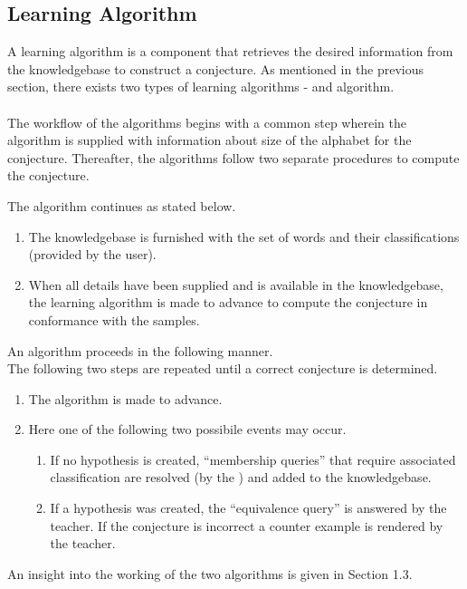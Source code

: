 \subsection{Learning Algorithm}
	A learning algorithm is a component that retrieves the desired information from the knowledgebase to construct a conjecture. As mentioned in the previous section, there exists two types of learning algorithms - \offline and \online algorithm. 
	\paragraph{}
	The workflow of the algorithms begins with a common step wherein the algorithm is supplied with information about size of the alphabet for the conjecture. Thereafter, the algorithms follow two separate procedures to compute the conjecture.
	
	The \offline algorithm continues as stated below.
\begin{enumerate}
	\item The knowledgebase is furnished with the set of words and their classifications (provided by the user).
	\item When all details have been supplied and is available in the knowledgebase, the learning algorithm is made to advance to 	compute the conjecture in conformance with the samples.
\end{enumerate}

	An \online algorithm proceeds in the following manner. \\
	The following two steps are repeated until a correct conjecture is determined.
\begin{enumerate}
\item The algorithm is made to advance.
\item Here one of the following two possibile events may occur.
\begin{enumerate}
\item If no hypothesis is created, ``membership queries'' that require associated classification are resolved (by the \teacher) and added to the knowledgebase.
\item If a hypothesis was created, the ``equivalence query'' is answered by the teacher. If the conjecture is incorrect a counter example is rendered by the teacher.
\end{enumerate}
\end{enumerate}	
	
An insight into the working of the two algorithms is given in Section 1.3.
	
